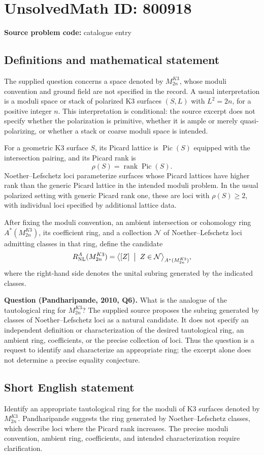 \documentclass[11pt]{article}
\begin{document}
\section*{UnsolvedMath ID: 800918}
\textbf{Source problem code:} catalogue entry
\subsection{Definitions and mathematical statement}
The supplied question concerns a space denoted by \(M^{K3}_{2n}\), whose moduli convention and ground field are not specified in the record. A usual interpretation is a moduli space or stack of polarized K3 surfaces \((S,L)\) with \(L^2=2n\), for a positive integer \(n\). This interpretation is conditional: the source excerpt does not specify whether the polarization is primitive, whether it is ample or merely quasi-polarizing, or whether a stack or coarse moduli space is intended.

For a geometric K3 surface \(S\), its Picard lattice is \(\operatorname{Pic}(S)\) equipped with the intersection pairing, and its Picard rank is
\[
\rho(S)=\operatorname{rank}\operatorname{Pic}(S).
\]
Noether--Lefschetz loci parameterize surfaces whose Picard lattices have higher rank than the generic Picard lattice in the intended moduli problem. In the usual polarized setting with generic Picard rank one, these are loci with \(\rho(S)\geq 2\), with individual loci specified by additional lattice data.

After fixing the moduli convention, an ambient intersection or cohomology ring \(A^*(M^{K3}_{2n})\), its coefficient ring, and a collection \(\mathcal N\) of Noether--Lefschetz loci admitting classes in that ring, define the candidate
\[
R_{\mathrm{NL}}^{A}(M^{K3}_{2n})
=
\bigl\langle [Z]\;\bigm|\;Z\in\mathcal N\bigr\rangle_{A^*(M^{K3}_{2n})},
\]
where the right-hand side denotes the unital subring generated by the indicated classes.

\textbf{Question (Pandharipande, 2010, Q6).} What is the analogue of the tautological ring for \(M^{K3}_{2n}\)? The supplied source proposes the subring generated by classes of Noether--Lefschetz loci as a natural candidate. It does not specify an independent definition or characterization of the desired tautological ring, an ambient ring, coefficients, or the precise collection of loci. Thus the question is a request to identify and characterize an appropriate ring; the excerpt alone does not determine a precise equality conjecture.
\subsection{Short English statement}
Identify an appropriate tautological ring for the moduli of K3 surfaces denoted by \(M^{K3}_{2n}\). Pandharipande suggests the ring generated by Noether--Lefschetz classes, which describe loci where the Picard rank increases. The precise moduli convention, ambient ring, coefficients, and intended characterization require clarification.
\end{document}
